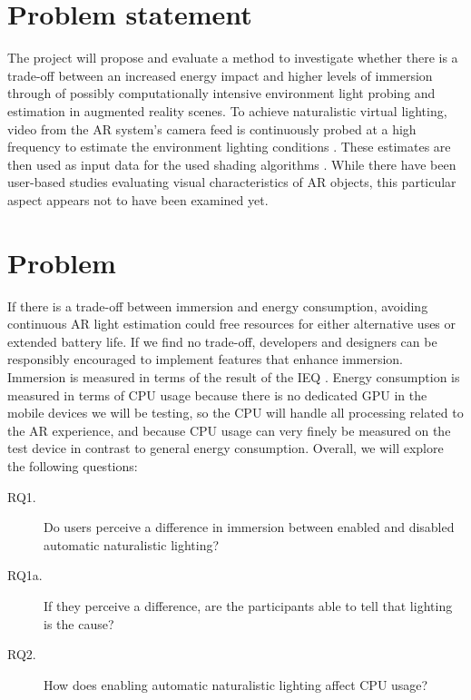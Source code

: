 \documentclass[12pt,twoside,english]{article}
\begin{document}
\section{Problem statement}
\label{sect:problem_statement}

The project will propose and evaluate a method to investigate whether there is a trade-off between an increased energy impact and higher levels of immersion through of possibly computationally intensive environment light probing and estimation in augmented reality scenes.
To achieve naturalistic virtual lighting, video from the AR system's camera feed is continuously probed at a high frequency to estimate the environment lighting conditions \cite{apple_adding_nodate}.
These estimates are then used as input data for the used shading algorithms \cite{apple_adding_nodate}.
While there have been user-based studies evaluating visual characteristics of \gls{AR} objects, this particular aspect appears not to have been examined yet.

\section{Problem}
\label{sect:problem}

If there is a trade-off between immersion and energy consumption, avoiding continuous \gls{AR} light estimation could free resources for either alternative uses or extended battery life.
If we find no trade-off, developers and designers can be responsibly encouraged to implement features that enhance immersion.
Immersion is measured in terms of the result of the \gls{IEQ} \cite{jennett_measuring_2008}.
Energy consumption is measured in terms of \gls{CPU} usage because there is no dedicated \gls{GPU} in the mobile devices we will be testing, so the \gls{CPU} will handle all processing related to the \gls{AR} experience, and because CPU usage can very finely be measured on the test device in contrast to general energy consumption.
Overall, we will explore the following questions:

\begin{description}
    \item[RQ1.] Do users perceive a difference in immersion between enabled and disabled automatic naturalistic lighting?
    \item[RQ1a.] If they perceive a difference, are the participants able to tell that lighting is the cause?
    \item[RQ2.] How does enabling automatic naturalistic lighting affect \gls{CPU} usage?
\end{description}
\end{document}
